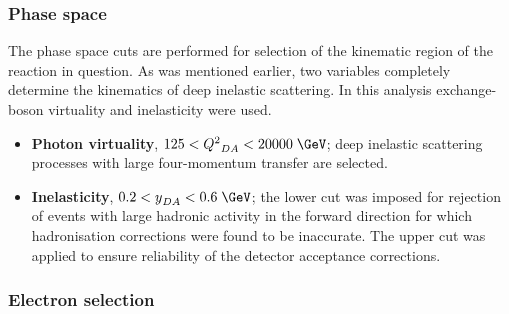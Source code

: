 \subsubsection{Phase space}
\label{subsubsec:phasespace}
The phase space cuts are performed for selection of the kinematic region of the reaction in question. As was mentioned earlier, two variables completely determine the kinematics of deep inelastic scattering. In this analysis exchange-boson virtuality \qsq and inelasticity \y were used.
\begin{itemize}
	\item \textbf{Photon virtuality}, $125 < \qsq_{DA} < 20000\;\GeV$;  deep inelastic scattering processes with large four-momentum transfer are selected.
	\item \textbf{Inelasticity}, $0.2 < \y_{DA} < 0.6\;\GeV$; the lower cut was imposed for rejection of events with large hadronic activity in the forward direction for which hadronisation corrections were found to be inaccurate. The upper cut was applied to ensure reliability of the detector acceptance corrections.
\end{itemize}

\subsubsection{Electron selection}
\label{subsubsec:eleselect}


